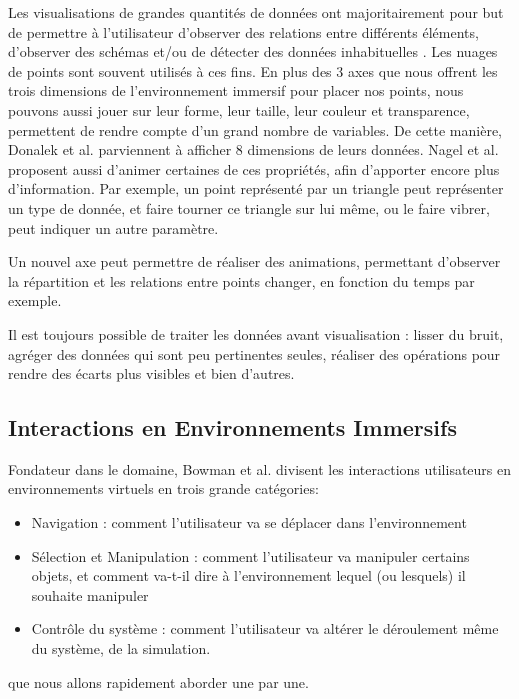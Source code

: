 	 Les visualisations de grandes quantités de données ont majoritairement pour but de permettre à l'utilisateur d'observer des relations entre différents éléments, d'observer des schémas et/ou de détecter des données inhabituelles \cite{nagel_methods_2001}.
	Les nuages de points sont souvent utilisés à ces fins. En plus des 3 axes que nous offrent les trois dimensions de l'environnement immersif pour placer nos points, nous pouvons aussi jouer sur leur forme, leur taille, leur couleur et transparence, permettent de rendre compte d'un grand nombre de variables. De cette manière, Donalek et al. \cite{donalek_immersive_2014} parviennent à afficher 8 dimensions de leurs données. Nagel et al. \cite{nagel_methods_2001} proposent aussi d'animer certaines de ces propriétés, afin d'apporter encore plus d'information. Par exemple, un point représenté par un triangle peut représenter un type de donnée, et faire tourner ce triangle sur lui même, ou le faire vibrer, peut indiquer un autre paramètre.
	
	
	
	 Un nouvel axe peut permettre de réaliser des animations, permettant d'observer la répartition et les relations entre points changer, en fonction du temps par exemple.
	
	Il est toujours possible de traiter les données avant visualisation : lisser du bruit, agréger des données qui sont peu pertinentes seules, réaliser des opérations pour rendre des écarts plus visibles et bien d'autres.
	
	\subsection{Interactions en Environnements Immersifs}
	
	Fondateur dans le domaine, Bowman et al. \cite{bowman_introduction_2001} divisent les interactions utilisateurs en environnements virtuels en trois grande catégories:
	\begin{itemize}
		\item Navigation : comment l'utilisateur va se déplacer dans l'environnement
		\item Sélection et Manipulation : comment l'utilisateur va manipuler certains objets, et comment va-t-il dire à l'environnement lequel (ou lesquels) il souhaite manipuler
		\item Contrôle du système : comment l'utilisateur va altérer le déroulement même du système, de la simulation.
	\end{itemize}
	que nous allons rapidement aborder une par une.
	
